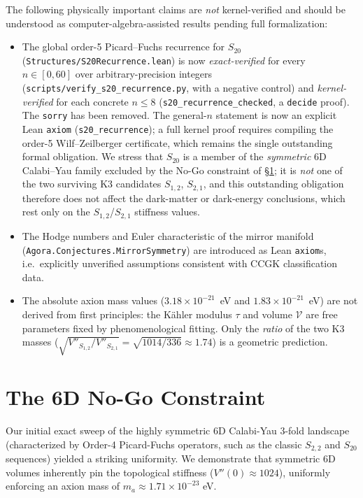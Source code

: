 \documentclass[11pt,a4paper]{article}
\begin{document}
The following physically important claims are \emph{not} kernel-verified and should be understood as computer-algebra-assisted results pending full formalization:
\begin{itemize}
  \item The global order-5 Picard--Fuchs recurrence for $S_{20}$ (\texttt{Structures/S20Recurrence.lean}) is now \emph{exact-verified} for every $n\in[0,60]$ over arbitrary-precision integers (\texttt{scripts/verify\_s20\_recurrence.py}, with a negative control) and \emph{kernel-verified} for each concrete $n\le 8$ (\texttt{s20\_recurrence\_checked}, a \texttt{decide} proof). The \texttt{sorry} has been removed. The general-$n$ statement is now an explicit Lean \texttt{axiom} (\texttt{s20\_recurrence}); a full kernel proof requires compiling the order-5 Wilf--Zeilberger certificate, which remains the single outstanding formal obligation. We stress that $S_{20}$ is a member of the \emph{symmetric} 6D Calabi--Yau family excluded by the No-Go constraint of §\ref{sec:nogo}; it is \emph{not} one of the two surviving K3 candidates $S_{1,2}$, $S_{2,1}$, and this outstanding obligation therefore does not affect the dark-matter or dark-energy conclusions, which rest only on the $S_{1,2}$/$S_{2,1}$ stiffness values.
  \item The Hodge numbers and Euler characteristic of the mirror manifold (\texttt{Agora.Conjectures.MirrorSymmetry}) are introduced as Lean \texttt{axiom}s, i.e.\ explicitly unverified assumptions consistent with CCGK classification data.
  \item The absolute axion mass values ($3.18 \times 10^{-21}$~eV and $1.83 \times 10^{-21}$~eV) are not derived from first principles: the Kähler modulus $\tau$ and volume $\mathcal{V}$ are free parameters fixed by phenomenological fitting. Only the \emph{ratio} of the two K3 masses ($\sqrt{V''_{S_{1,2}}/V''_{S_{2,1}}} = \sqrt{1014/336} \approx 1.74$) is a geometric prediction.
\end{itemize}

\section{The 6D No-Go Constraint}\label{sec:nogo}
Our initial exact sweep of the highly symmetric 6D Calabi-Yau 3-fold landscape (characterized by Order-4 Picard-Fuchs operators, such as the classic $S_{2,2}$ and $S_{20}$ sequences) yielded a striking uniformity. We demonstrate that symmetric 6D volumes inherently pin the topological stiffness ($V''(0) \approx 1024$), uniformly enforcing an axion mass of $m_a \approx 1.71 \times 10^{-23}$ eV.
\end{document}
